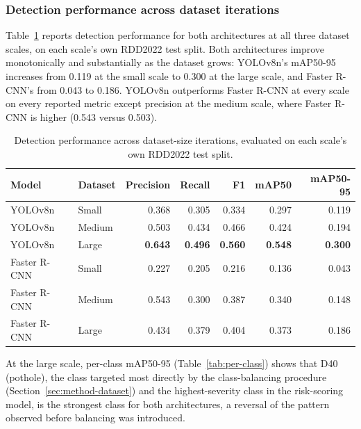 \documentclass[10pt,a4paper,twocolumn]{article}
\begin{document}
\subsubsection{Detection performance across dataset iterations}
\label{sec:res-iterations}

Table~\ref{tab:iteration-results} reports detection performance for both
architectures at all three dataset scales, on each scale's own RDD2022
test split. Both architectures improve monotonically and substantially as
the dataset grows: YOLOv8n's mAP50-95 increases from 0.119 at the small
scale to 0.300 at the large scale, and Faster R-CNN's from 0.043 to
0.186. YOLOv8n outperforms Faster R-CNN at every scale on every reported metric
except precision at the medium scale, where Faster R-CNN is higher
(0.543 versus 0.503).

\begin{table}[t]
  \centering
  \small
  \caption{Detection performance across dataset-size iterations, evaluated on
  each scale's own RDD2022 test split.}
  \label{tab:iteration-results}
  \begin{tabular}{llrrrrr}
    \toprule
    Model & Dataset & Precision & Recall & F1 & mAP50 & mAP50-95 \\
    \midrule
    YOLOv8n       & Small  & 0.368 & 0.305 & 0.334 & 0.297 & 0.119 \\
    YOLOv8n       & Medium & 0.503 & 0.434 & 0.466 & 0.424 & 0.194 \\
    YOLOv8n       & Large  & \textbf{0.643} & \textbf{0.496} & \textbf{0.560} & \textbf{0.548} & \textbf{0.300} \\
    Faster R-CNN  & Small  & 0.227 & 0.205 & 0.216 & 0.136 & 0.043 \\
    Faster R-CNN  & Medium & 0.543 & 0.300 & 0.387 & 0.340 & 0.148 \\
    Faster R-CNN  & Large  & 0.434 & 0.379 & 0.404 & 0.373 & 0.186 \\
    \bottomrule
  \end{tabular}
\end{table}

At the large scale, per-class mAP50-95 (Table~\ref{tab:per-class}) shows
that D40 (pothole), the class targeted most directly by the class-balancing
procedure (Section~\ref{sec:method-dataset}) and the highest-severity class
in the risk-scoring model, is the strongest class for both architectures,
a reversal of the pattern observed before balancing was introduced.
\end{document}
